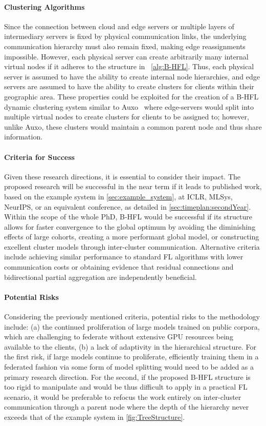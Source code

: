 \paragraph{Clustering Algorithms}  Since the connection between cloud and edge servers or multiple layers of intermediary servers is fixed by physical communication links, the underlying communication hierarchy must also remain fixed, making edge reassignments impossible. However, each physical server can create arbitrarily many internal virtual nodes if it adheres to the structure in ~\cref{alg:B-HFL}. Thus, each physical server is assumed to have the ability to create internal node hierarchies, and edge servers are assumed to have the ability to create clusters for clients within their geographic area. These properties could be exploited for the creation of a B-HFL dynamic clustering system similar to Auxo~\citep{Auxo} where edge-servers would split into multiple virtual nodes to create clusters for clients to be assigned to; however, unlike Auxo, these clusters would maintain a common parent node and thus share information.
\paragraph{Criteria for Success} Given these research directions, it is essential to consider their impact. The proposed research will be successful in the near term if it leads to published work, based on the example system in \cref{sec:example_system}, at ICLR, MLSys, NeurIPS, or an equivalent conference, as detailed in \cref{sec:timeplan:secondYear}. Within the scope of the whole PhD, B-HFL would be successful if its structure allows for faster convergence to the global optimum by avoiding the diminishing effects of large cohorts, creating a more performant global model, or constructing excellent cluster models through inter-cluster communication. Alternative criteria include achieving similar performance to standard FL algorithms with lower communication costs or obtaining evidence that residual connections and bidirectional partial aggregation are independently beneficial.
\paragraph{Potential Risks} Considering the previously mentioned criteria, potential risks to the methodology include: (a) the continued proliferation of large models trained on public corpora, which are challenging to federate without extensive GPU resources being available to the clients, (b) a lack of adaptivity in the hierarchical structure. For the first risk, if large models continue to proliferate, efficiently training them in a federated fashion via some form of model splitting would need to be added as a primary research direction. For the second, if the proposed B-HFL structure is too rigid to manipulate and would be thus difficult to apply in a practical FL scenario, it would be preferable to refocus the work entirely on inter-cluster communication through a parent node where the depth of the hierarchy never exceeds that of the example system in \cref{fig:TreeStructure}.


